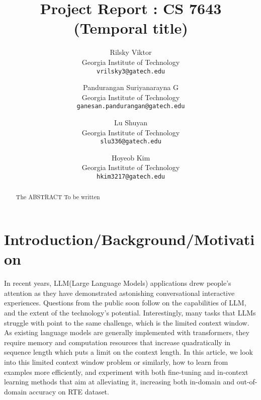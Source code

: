 \documentclass[10pt,twocolumn,letterpaper]{article}
\begin{document}
\title{Project Report : CS 7643 (Temporal title)}

\author{Rilsky Viktor\\
Georgia Institute of Technology\\
{\tt\small vrilsky3@gatech.edu}
\and
Pandurangan Suriyanarayna G\\
Georgia Institute of Technology\\
{\tt\small ganesan.pandurangan@gatech.edu}
\and
Lu Shuyan\\
Georgia Institute of Technology\\
{\tt\small slu336@gatech.edu}
\and
Hoyeob Kim\\
Georgia Institute of Technology\\
{\tt\small hkim3217@gatech.edu}
}

\maketitle

\begin{abstract}
   The ABSTRACT To be written
\end{abstract}

\section{Introduction/Background/Motivation}
In recent years, LLM(Large Language Models) applications drew people’s attention as they have demonstrated astonishing conversational interactive experiences. Questions from the public soon follow on the capabilities of LLM, and the extent of the technology’s potential. Interestingly, many tasks that LLMs struggle with point to the same challenge, which is the limited context window. As existing language models are generally implemented with transformers, they require memory and computation resources that increase quadratically in sequence length which puts a limit on the context length. In this article, we look into this limited context window problem or similarly, how to learn from examples more efficiently, and experiment with both fine-tuning and in-context learning methods that aim at alleviating it, increasing both in-domain and out-of-domain accuracy on RTE dataset.
\end{document}
